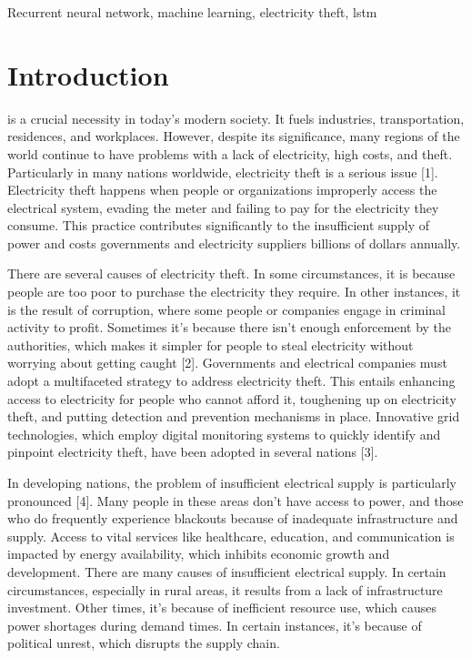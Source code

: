 \documentclass{ieeeaccess}
\begin{document}
\begin{keywords}
Recurrent neural network, machine learning, electricity theft, lstm
\end{keywords}

\titlepgskip=-21pt

\maketitle

\section{Introduction}
\label{sec:introduction}
 is a crucial necessity in today's modern society. It fuels industries, transportation, residences, and workplaces. However, despite its significance, many regions of the world continue to have problems with a lack of electricity, high costs, and theft.
Particularly in many nations worldwide, electricity theft is a serious issue [1]. Electricity theft happens when people or organizations improperly access the electrical system, evading the meter and failing to pay for the electricity they consume. This practice contributes significantly to the insufficient supply of power and costs governments and electricity suppliers billions of dollars annually.


There are several causes of electricity theft. In some circumstances, it is because people are too poor to purchase the electricity they require. In other instances, it is the result of corruption, where some people or companies engage in criminal activity to profit. Sometimes it's because there isn't enough enforcement by the authorities, which makes it simpler for people to steal electricity without worrying about getting caught [2]. Governments and electrical companies must adopt a multifaceted strategy to address electricity theft. This entails enhancing access to electricity for people who cannot afford it, toughening up on electricity theft, and putting detection and prevention mechanisms in place. Innovative grid technologies, which employ digital monitoring systems to quickly identify and pinpoint electricity theft, have been adopted in several nations [3].


In developing nations, the problem of insufficient electrical supply is particularly pronounced [4]. Many people in these areas don't have access to power, and those who do frequently experience blackouts because of inadequate infrastructure and supply. Access to vital services like healthcare, education, and communication is impacted by energy availability, which inhibits economic growth and development.
There are many causes of insufficient electrical supply. In certain circumstances, especially in rural areas, it results from a lack of infrastructure investment. Other times, it's because of inefficient resource use, which causes power shortages during demand times. In certain instances, it's because of political unrest, which disrupts the supply chain.
\end{document}
